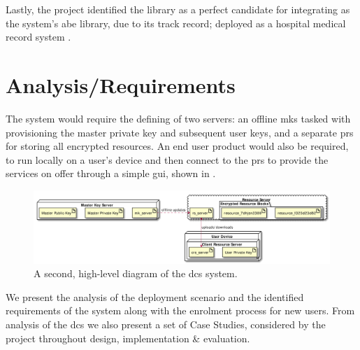 \documentclass[british,table,svgnames,xcdraw]{l4proj}
\begin{document}
Lastly, the project identified the \OpenABE library as a perfect candidate for integrating as the system's \acrshort{abe} library, due to its track record; deployed as a hospital medical record system \citep{Akinyele2011}.

\chapter{Analysis/Requirements}
\label{ch:analysis}

The \theResServer system would require the defining of two servers: an offline \acrfull{mks} tasked with provisioning the master private key and subsequent user keys, and a separate \acrfull{prs} for storing all encrypted resources. An end user product would also be required, to run locally on a user's device and then connect to the \acrshort{prs} to provide the services on offer through a simple \acrshort{gui}, shown in .

\begin{figure}[htp]
  \centering
  \includegraphics[width=\linewidth,keepaspectratio]{images/infrastructure/deployment_abbrv2.pdf}

  \caption{A second, high-level diagram of the \acrshort{dcs} \theResServer system.}

  \label{fig:deployment_abbrv2_diagram}
\end{figure}

We present the analysis of the deployment scenario and the identified requirements of the \theResServer system along with the enrolment process for new users. From analysis of the \acrfull{dcs} we also present a set of Case Studies, considered by the project throughout design, implementation \& evaluation.






\end{document}

